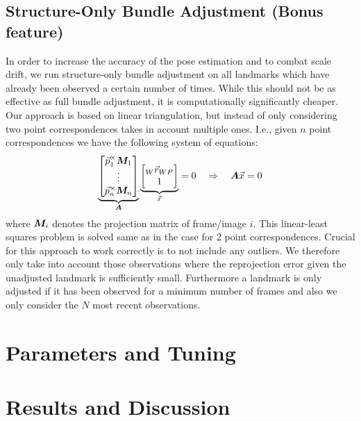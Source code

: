 \documentclass[11pt]{article}
\newcommand{\mat}{\matrixsym}
\begin{document}
\subsection{Structure-Only Bundle Adjustment (Bonus feature)}
In order to increase the accuracy of the pose estimation and to combat scale drift, we run structure-only bundle adjustment on all landmarks which have already been observed a certain number of times. While this should not be as effective as full bundle adjustment, it is computationally significantly cheaper.\\
Our approach is based on linear triangulation, but instead of only considering two point correspondences takes in account multiple ones. I.e., given $n$ point correspondences we have the following system of equations:
\begin{equation*}
\underbrace{\begin{bmatrix} \vec{p}_1^\times \mat{M}_1\\ \vdots \\ \vec{p}_n^\times \mat{M}_n \end{bmatrix}}_{\mat{A}} \underbrace{\begin{bmatrix} {}_W\vec{r}_{WP} \\ 1 \end{bmatrix}}_{\vec{x}} = 0 \quad \Rightarrow \quad \mat{A} \vec{x} = 0
\end{equation*}
where $\mat{M}_i$ denotes the projection matrix of frame/image $i$. This linear-least squares problem is solved same as in the case for 2 point correspondences. Crucial for this approach to work correctly is to not include any outliers. We therefore only take into account those observations where the reprojection error given the unadjusted landmark is sufficiently small. Furthermore a landmark is only adjusted if it has been observed for a minimum number of frames and also we only consider the $N$ most recent observations.

\section{Parameters and Tuning}

\section{Results and Discussion}
\end{document}
